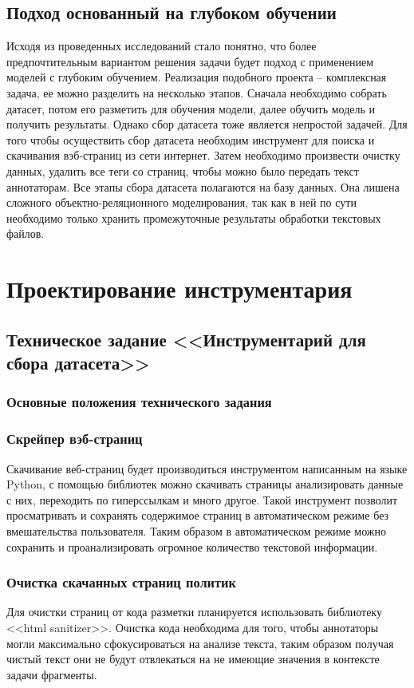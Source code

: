 \documentclass[../main]{subfiles}
\begin{document}
\subsection{Подход основанный на глубоком обучении}
Исходя из проведенных исследований стало понятно, что более предпочтительным вариантом решения задачи будет подход с применением моделей с глубоким обучением. Реализация подобного проекта -- комплексная задача, ее можно разделить на несколько этапов. Сначала необходимо собрать датасет, потом его разметить для обучения модели, далее обучить модель и получить результаты. Однако сбор датасета тоже является непростой задачей. Для того чтобы осуществить сбор датасета необходим инструмент для поиска и скачивания вэб-страниц из сети интернет. Затем необходимо произвести очистку данных, удалить все теги со страниц, чтобы можно было передать текст аннотаторам. Все этапы сбора датасета полагаются на базу данных. Она лишена сложного объектно-реляционного моделирования, так как в ней по сути необходимо только хранить промежуточные результаты обработки текстовых файлов.

\newpage
\section{Проектирование инструментария}

\subsection{Техническое задание <<Инструментарий для сбора датасета>>}

\subsubsection{Основные положения технического задания}

\subsubsection{Скрейпер вэб-страниц}
Скачивание веб-страниц будет производиться инструментом написанным на языке Python, с помощью библиотек можно скачивать страницы анализировать данные с них, переходить по гиперссылкам и много другое. Такой инструмент позволит просматривать и сохранять содержимое страниц в автоматическом режиме без вмешательства пользователя. Таким образом в автоматическом режиме можно сохранить и проанализировать огромное количество текстовой информации.

\subsubsection{Очистка скачанных страниц политик}
Для очистки страниц от кода разметки планируется использовать библиотеку <<html sanitizer>>. Очистка кода необходима для того, чтобы аннотаторы могли максимально сфокусироваться на анализе текста, таким образом получая чистый текст они не будут отвлекаться на не имеющие значения в контексте задачи фрагменты.
\end{document}

